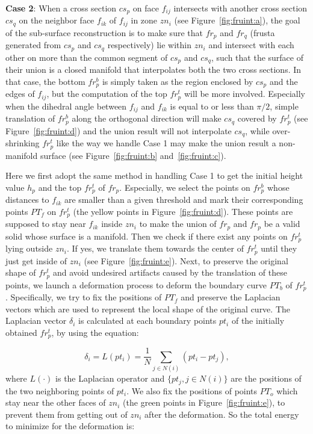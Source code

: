 \textbf{Case 2}: When  a cross section $cs_p$ on face $f_{ij}$
intersects with another cross section $cs_q$ on the neighbor face
$f_{ik}$ of $f_{ij}$ in zone $zn_i$ (see Figure~\ref{fig:fruint:a}),
the goal of the sub-surface reconstruction is to make sure that
$fr_p$ and $fr_q$ (frusta generated from $cs_p$ and $cs_q$
respectively) lie within $zn_i$ and intersect with each other on
more than the common segment of $cs_p$ and $cs_q$, such that the
surface of their union is a closed manifold that interpolates both
the two cross sections. In that case, the bottom $fr_p^b$ is simply
taken as the region enclosed by $cs_p$ and the edges of $f_{ij}$,
but the computation of the top $fr_p^t$ will be more involved.
Especially when the dihedral angle between $f_{ij}$ and $f_{ik}$ is
equal to or less than $\pi/2$, simple translation of $fr_p^b$ along
the orthogonal direction will make $cs_q$ covered by $fr_p^t$ (see
Figure~\ref{fig:fruint:d}) and the union result will not interpolate
$cs_q$, while over-shrinking $fr_p^t$ like the way we handle Case 1
may make the union result a non-manifold surface (see
Figure~\ref{fig:fruint:b} and~\ref{fig:fruint:c}).

Here we first adopt  the same method in handling Case 1 to get the
initial height value $h_p$ and the top $fr_p^t$ of $fr_p$.
Especially, we select the points on $fr_p^b$ whose distances to
$f_{ik}$ are smaller than a given threshold and mark their
corresponding points $PT_f$ on $fr_p^t$ (the yellow points in
Figure~\ref{fig:fruint:d}). These points are supposed to stay near
$f_{ik}$ inside $zn_i$ to make the union of $fr_p$ and $fr_p$ be a
valid solid whose surface is a manifold. Then we check if there
exist any points on $fr_p^t$ lying outside $zn_i$. If yes, we
translate them towards the center of $fr_p^t$ until they just get
inside of $zn_i$ (see Figure~\ref{fig:fruint:e}). Next, to preserve
the original shape of $fr_p^t$ and avoid undesired artifacts caused
by the translation of these points, we launch a deformation process
to deform the boundary curve $PT_b$ of $fr_p^t$. Specifically, we
try to fix the positions of $PT_f$ and preserve the Laplacian
vectors which are used to represent the local shape of the original
curve. The Laplacian vector $\delta_i$ is calculated at each
boundary points $pt_i$ of the initially obtained $fr_p^t$, by using
the equation:

\begin{equation}
\label{eq:curveLap}
\delta_i=L(pt_i)=\frac{1}{N}\sum\limits_{j\in N(i)}{(pt_i-pt_j)},
\end{equation}
where $L(\cdot)$ is the Laplacian operator and $\{pt_j, j\in N(i)\}$ are the positions of the two neighboring points of $pt_i$. We also fix the positions of points $PT_o$ which stay near the other faces of $zn_i$ (the green points in Figure~\ref{fig:fruint:e}), to prevent them from getting out of $zn_i$ after the deformation. So the total energy to minimize for the deformation is:

